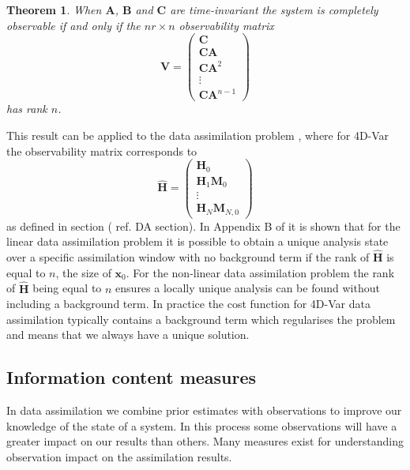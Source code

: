 \documentclass[11pt]{article}
\newtheorem{theorem}{Theorem}[section]
\begin{document}
\begin{theorem} \label{thm:observable}
When $\textbf{A}$, $\textbf{B}$ and $\textbf{C}$ are time-invariant the system is completely observable if and only if the $nr \times n$ observability matrix
\begin{equation}
\mathbf{V}=
\begin{pmatrix}
\mathbf{C} \\
\mathbf{C}\mathbf{A}\\
\mathbf{C}\mathbf{A}^{2}\\
\vdots \\
\mathbf{C}\mathbf{A}^{n-1}
\end{pmatrix}
\end{equation}
has rank $n$.
\end{theorem}

This result can be applied to the data assimilation problem \citep{johnson2005singular}, where for 4D-Var the observability matrix corresponds to
\begin{equation}
\hat{\mathbf{H}}=
\begin{pmatrix}
\mathbf{H}_0 \\
\mathbf{H}_1\mathbf{M}_0\\
\vdots \\
\mathbf{H}_N\mathbf{M}_{N,0}
\end{pmatrix} \label{eqn: hmat}
\end{equation}
as defined in section ({\color{red} ref. DA section}). In Appendix B of \citet{zou1992incomplete} it is shown that for the linear data assimilation problem it is possible to obtain a unique analysis state over a specific assimilation window with no background term if the rank of $\hat{\textbf{H}}$ is equal to $n$, the size of $\textbf{x}_0$. For the non-linear data assimilation problem the rank of $\hat{\textbf{H}}$ being equal to $n$ ensures a locally unique analysis can be found without including a background term. In practice the cost function for 4D-Var data assimilation typically contains a background term which regularises the problem and means that we always have a unique solution.

\subsection{Information content measures} \label{sec:IC}%

In data assimilation we combine prior estimates with observations to improve our knowledge of the state of a system. In this process some observations will have a greater impact on our results than others. Many measures exist for understanding observation impact on the assimilation results.
\end{document}

